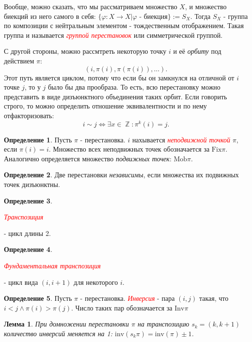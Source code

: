 \documentclass[a4paper,100pt]{article}
\theoremstyle{indented}
\newtheorem{lemma}{Лемма}
\theoremstyle{definition}
\newtheorem{defn}{Определение}
\theoremstyle{remark}
\DeclareMathOperator{\ZZ}{\mathbb{Z}}
\begin{document}
Вообще, можно сказать, что мы рассматриваем множество $X$, и множество биекций из него самого в себя: $\{\varphi: X\rightarrow X \vert \varphi \text{ - биекция}\}:=S_X$. Тогда $S_X$ - группа по композиции с нейтральным элементом - тождественным отображением. Такая группа и называется \hypertarget{n72}{\textcolor{red}{\textit{группой перестановок}}} или симметрической группой.\ 

С другой стороны, можно рассмтреть некоторую точку $i$ и её \textit{орбиту} под действием $\pi$:
\[
    (i, \pi(i), \pi(\pi(i)), \dots).
\]
Этот путь является циклом, потому что если бы он замкнулся на отличной от $i$ точке $j$, то у $j$ было бы два прообраза. То есть, всю перестановку можно представить в виде дизъюнктного объединения таких орбит. Если говорить строго, то можно определить отношение эквивалентности и по нему отфакторизовать:
\[
    i\sim j \Leftrightarrow \exists x\in \ZZ : \pi^k(i)=j.
\]

\begin{defn}
    Пусть  $\pi$ - перестановка. $i$ нахывается \hypertarget{n73}{\textcolor{red}{\textit{неподвижной точкой}}} $\pi$, если $\pi(i)=i$. Множество всех неподвижных точек обозначается за $\text{Fix} \pi$. Аналогично определяется множество \textit{подвижных точек}: $\text{Mob}\pi$.
\end{defn}

\begin{defn}
    Две перестановки \textit{независимы}, если множества их подвижных точек дизъюнктны.
\end{defn}

\begin{defn}
    \hypertarget{n74}{\textcolor{red}{\textit{Транспозиция}}} - цикл длины 2.
\end{defn}

\begin{defn}
    \hypertarget{n75}{\textcolor{red}{\textit{Фундаментальная транспозиция}}} - цикл вида $(i, i+1)$ для некоторого $i$.
\end{defn}

\begin{defn}
    Пусть $\pi$ - перестановка. \hypertarget{n76}{\textcolor{red}{\textit{Инверсия}}} - пара $ (i, j)$ такая, что $i<j\wedge \pi(i)>\pi(j)$. Число таких пар обозначается за $\text{Inv} \pi$
\end{defn}

\begin{lemma}
    При домножении перестановки $\pi$ на транспозицию $s_k=(k,k+1)$ количество инверсий меняется на 1: $\text{inv}(s_k\pi)=\text{inv}(\pi)±1$.
\end{lemma}
\end{document}
